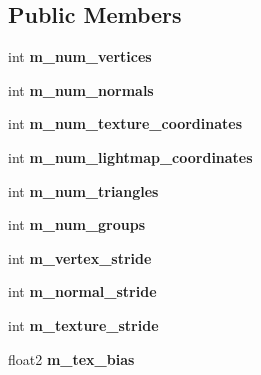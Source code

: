 \subsection*{Public Members}
\begin{DoxyCompactItemize}
\item 
\mbox{\label{class_mesh_storage_a92a2e2703b83efaf32d6f00a21f7c101}} 
int {\bfseries m\+\_\+num\+\_\+vertices}
\item 
\mbox{\label{class_mesh_storage_a003cc5d14f49f31b7ae6938798de65b0}} 
int {\bfseries m\+\_\+num\+\_\+normals}
\item 
\mbox{\label{class_mesh_storage_a8ebb85369d9e472dc37750840c4cb20e}} 
int {\bfseries m\+\_\+num\+\_\+texture\+\_\+coordinates}
\item 
\mbox{\label{class_mesh_storage_ab1e7eaa97d95a8bd72b5909ef0d5d8be}} 
int {\bfseries m\+\_\+num\+\_\+lightmap\+\_\+coordinates}
\item 
\mbox{\label{class_mesh_storage_af53b7e7afad2f128b3785cec5ca1ce59}} 
int {\bfseries m\+\_\+num\+\_\+triangles}
\item 
\mbox{\label{class_mesh_storage_ad2074d66d8639403eb78dfd8b9ac2594}} 
int {\bfseries m\+\_\+num\+\_\+groups}
\item 
\mbox{\label{class_mesh_storage_a31c59cf0e57653f8de5ae14e27f00b82}} 
int {\bfseries m\+\_\+vertex\+\_\+stride}
\item 
\mbox{\label{class_mesh_storage_af9d9d6be5e6eb06d4ef5cd25a66532b0}} 
int {\bfseries m\+\_\+normal\+\_\+stride}
\item 
\mbox{\label{class_mesh_storage_af90392c634ac0525cfdf2c22a5739239}} 
int {\bfseries m\+\_\+texture\+\_\+stride}
\item 
\mbox{\label{class_mesh_storage_af00c0cb8ae8b107d2c162b255b95578b}} 
float2 {\bfseries m\+\_\+tex\+\_\+bias}
\item 
\mbox{\label{class_mesh_storage_a12e894bf77e27e754e93500e39145126}} 

\end{DoxyCompactItemize}
